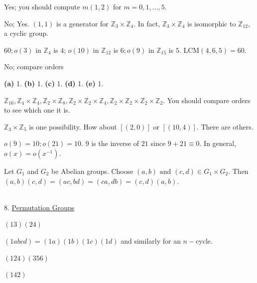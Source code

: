 \documentclass[12pt]{book}
\theoremstyle{definition}
\begin{document}
\begin{oddenumerate}
	\item Yes; you should compute $ m(1,2) $ for $ m=0,1,\dots, 5. $
	
	\item No; Yes. $ (1,1) $ is a generator for $ \mathbb{Z}_3 \times \mathbb{Z}_4. $ In fact, $ \mathbb{Z}_3 \times \mathbb{Z}_4 $ is isomorphic to $ \mathbb{Z}_{12} $, a cyclic group. 
	
	\item $ 60; o(3) $ in $ \mathbb{Z}_4 $ is $ 4 $; $ o(10) $ in $ \mathbb{Z}_{12} $ is $ 6; o(9) $ in $ \mathbb{Z}_{15} $ is $ 5 $. LCM$ (4,6,5)=60. $
	
	\item No; compare orders
	
	\item \textbf{(a)} 1. \textbf{(b)} 1. \textbf{(c)} 1. \textbf{(d)} 1. \textbf{(e)} 1.
	
	\item $ \mathbb{Z}_{16},\mathbb{Z}_4 \times \mathbb{Z}_4, \mathbb{Z}_2 \times \mathbb{Z}_8, \mathbb{Z}_2 \times \mathbb{Z}_2\times \mathbb{Z}_4 , \mathbb{Z}_2 \times \mathbb{Z}_2 \times \mathbb{Z}_2 \times \mathbb{Z}_2 $. You should compare orders to see which one it is. 
	
	\item $ \mathbb{Z}_3 \times \mathbb{Z}_5$ is one possibility. How about $ [(2,0)] $ or $ [(10,4)] $. There are others. 
	
	\item $ o(9)=10; o(21)=10 $. $ 9 $ is the inverse of $ 21 $ since $ 9+21\equiv 0 $. In general, $ o(x)= o(x^{-1}) .$
	
	\item Let $ G_1 $ and $ G_2 $ be Abelian groups. Choose $(a,b) \text{ and } (c,d)\in G_1\times G_2.$ Then $(a,b)(c,d)=(ac,bd)=(ca,db)=(c,d)(a,b) $.
	
	
	
	
\end{oddenumerate}


~\\[.1in]
{\Large 8. \underline{Permutation Groups}}

\begin{oddenumerate}
	\item $ (13)(24) $
	
	\item $ (1 a b c d)= (1 a)(1 b)(1 c)(1 d) $ and similarly for an $ n- $cycle.
	
	\item $ (124)(356) $
	
	\item $ (142) $
	
	
	
	
	
	
\end{oddenumerate}
\end{document}

